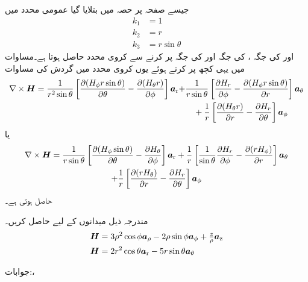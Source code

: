 جیسے صفحہ  پر حصہ  میں بتلایا گیا عمومی محدد میں
\begin{align*}
k_1&=1\\
k_2&=r\\
k_3&= r \sin \theta
\end{align*}
اور  کی جگہ ،  کی جگہ  اور  کی جگہ  پر کرنے سے کروی محدد حاصل ہوتا ہے۔مساوات  میں یہی کچھ پر کرتے ہوئے یوں کروی محدد میں گردش کی مساوات
\begin{align*}
\nabla \times {\ensuremath{{\boldsymbol{H}}}}=\frac{1}{r^2 \sin \theta}\left[\frac{\partial (H_\phi r \sin \theta)}{\partial \theta}-\frac{\partial (H_{\theta} r)}{\partial \phi} \right]{\boldsymbol{a}}_{\textup{r}}+&\frac{1}{r \sin \theta}\left[\frac{\partial H_r }{\partial \phi}-\frac{\partial (H_\phi  r \sin \theta)}{\partial r} \right]{\boldsymbol{a}}_{\theta}\\
&\quad +\frac{1}{r}\left[\frac{\partial (H_\theta r)}{\partial r}-\frac{\partial H_r }{\partial \theta} \right]{\boldsymbol{a}}_{\phi}
\end{align*}
یا
\begin{multline}\label{مساوات_مقناطیسی_کروی_گردش}
\nabla \times {\ensuremath{{\boldsymbol{H}}}}=\frac{1}{r \sin \theta}\left[\frac{\partial (H_{\phi}  \sin \theta)}{\partial \theta}-\frac{\partial H_{\theta} }{\partial \phi} \right]{\boldsymbol{a}}_{\textup{r}}+\frac{1}{r }\left[\frac{1}{\sin \theta}\frac{\partial H_r }{\partial \phi}-\frac{\partial (r H_{\phi} )}{\partial r} \right]{\boldsymbol{a}}_{\theta}
\\
 +\frac{1}{r}\left[\frac{\partial (r H_\theta )}{\partial r}-\frac{\partial H_r }{\partial \theta} \right]{\boldsymbol{a}}_{\phi}
\end{multline}
حاصل ہوتی ہے۔

مندرجہ ذیل میدانوں کے لیے  حاصل کریں۔
\begin{align*}
{\ensuremath{{\boldsymbol{H}}}}&=3\rho^2\cos\phi{\boldsymbol{a}}_{\rho}-2\rho\sin\phi{\boldsymbol{a}}_{\phi}+\tfrac{z}{\rho}{\boldsymbol{a}}_{\textup{z}}\\
{{\boldsymbol{H}}}&=2r^2\cos \theta{\boldsymbol{a}}_{\textup{r}}-5r\sin\theta {\boldsymbol{a}}_{\theta}
\end{align*}

جوابات:، 

